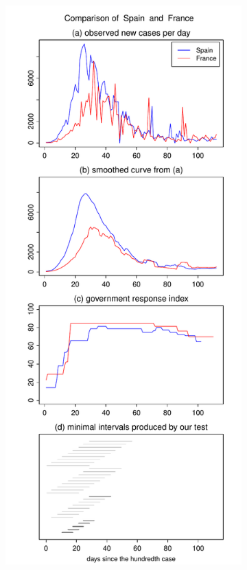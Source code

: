 \documentclass[a4paper,12pt]{article}
\numberwithin{equation}{section}
\begin{document}
\begin{figure}[t!]\ContinuedFloat
\begin{subfigure}[b]{0.475\textwidth}
\includegraphics[width=\textwidth]{plots/ESP_vs_FRA}

\end{subfigure}
\end{figure}
\end{document}
